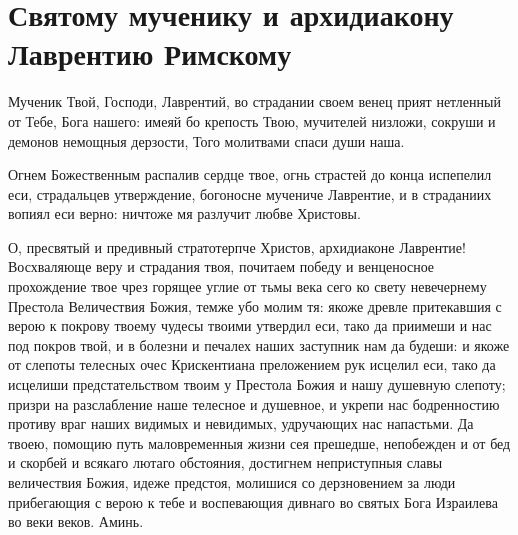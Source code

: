 \section{Святому мученику и архидиакону Лаврентию Римскому}\begin{mymulticols}


Мученик Твой, Господи, Лаврентий, во страдании своем венец прият нетленный от Тебе, Бога нашего: имеяй бо крепость Твою, мучителей низложи, сокруши и демонов немощныя дерзости, Того молитвами спаси души наша.


Огнем Божественным распалив сердце твое, огнь страстей до конца испепелил еси, страдальцев утверждение, богоносне мучениче Лаврентие, и в страданиих вопиял еси верно: ничтоже мя разлучит любве Христовы.


О, пресвятый и предивный стратотерпче Христов, архидиаконе Лаврентие! Восхваляюще веру и страдания твоя, почитаем победу и венценосное прохождение твое чрез горящее углие от тьмы века сего ко свету невечернему Престола Величествия Божия, темже убо молим тя: якоже древле притекавшия с верою к покрову твоему чудесы твоими утвердил еси, тако да приимеши и нас под покров твой, и в болезни и печалех наших заступник нам да будеши: и якоже от слепоты телесных очес Крискентиана преложением рук исцелил еси, тако да исцелиши предстательством твоим у Престола Божия и нашу душевную слепоту; призри на разслабление наше телесное и душевное, и укрепи нас бодренностию противу враг наших видимых и невидимых, удручающих нас напастьми. Да твоею, помощию путь маловременныя жизни сея прешедше, непобежден и от бед и скорбей и всякаго лютаго обстояния, достигнем неприступныя славы величествия Божия, идеже предстоя, молишися со дерзновением за люди прибегающия с верою к тебе и воспевающия дивнаго во святых Бога Израилева во веки веков. Аминь.

\end{mymulticols}

\mychapterending


